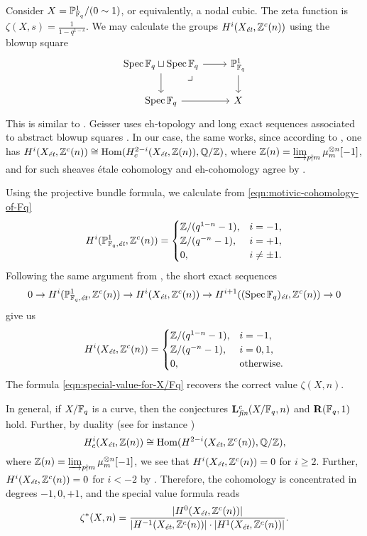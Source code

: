 \documentclass{article}
\numberwithin{equation}{section}
\begin{document}
\begin{example}
  Consider $X = \PP^1_{\FF_q}/(0\sim 1)$, or equivalently, a nodal cubic.
  The zeta function is $\zeta (X,s) = \frac{1}{1 - q^{1-s}}$.  We may calculate
  the groups $H^i (X_\et, \ZZ^c (n))$ using the blowup square
  \[ \begin{tikzcd}
      \Spec \FF_q \sqcup \Spec \FF_q \ar{r}\ar{d}\tikzpb & \PP^1_{\FF_q} \ar{d} \\
      \Spec \FF_q \ar{r} & X
    \end{tikzcd} \]
  This is similar to \cite[\S 8, Example~2]{Geisser-2006}. Geisser uses
  eh-topology and long exact sequences associated to abstract blowup squares
  \cite[Proposition~3.2]{Geisser-2006}. In our case, the same works, since
  according to \cite[Theorem~I]{Beshenov-Weil-etale-1}, one has
  $H^i (X_\et, \ZZ^c (n)) \cong \Hom (H^{2-i}_c (X_\et, \ZZ (n)),\QQ/\ZZ)$,
  where $\ZZ (n) = \varinjlim_{p\nmid m} \mu_m^{\otimes n} [-1]$, and
  for such sheaves étale cohomology and eh-cohomology agree by
  \cite[Theorem~3.6]{Geisser-2006}.

  Using the projective bundle formula, we calculate from
  \eqref{eqn:motivic-cohomology-of-Fq}
  \[ H^i (\PP^1_{\FF_q,\et}, \ZZ^c (n)) = \begin{cases}
      \ZZ/(q^{1-n} - 1), & i = -1, \\
      \ZZ/(q^{-n} - 1), & i = +1, \\
      0, & i \ne \pm 1.
    \end{cases} \]
  Following the same argument from \cite[\S 8, Example~2]{Geisser-2006},
  the short exact sequences
  \[ 0 \to H^i (\PP^1_{\FF_q,\et}, \ZZ^c (n)) \to
    H^i (X_\et, \ZZ^c (n)) \to
    H^{i+1} ((\Spec \FF_q)_\et, \ZZ^c (n)) \to 0 \]
  give us
  \[ H^i (X_\et, \ZZ^c (n)) = \begin{cases}
      \ZZ/(q^{1-n} - 1), & i = -1, \\
      \ZZ/(q^{-n} - 1), & i = 0,1, \\
      0, & \text{otherwise}.
    \end{cases} \]
  The formula \eqref{eqn:special-value-for-X/Fq} recovers the correct value
  $\zeta (X,n)$.
\end{example}

\begin{example}
  In general, if $X/\FF_q$ is a curve, then the conjectures
  $\mathbf{L}_\fin^c (X/\FF_q,n)$ and $\mathbf{R} (\FF_q,1)$ hold.
  Further, by duality
  (see for instance \cite[Theorem~1]{Beshenov-Weil-etale-1})
  $$H^i_c (X_\et, \ZZ(n)) \cong \Hom (H^{2-i} (X_\et, \ZZ^c (n)), \QQ/\ZZ),$$
  where
  $\ZZ (n) = \varinjlim_{p\nmid m} \mu_m^{\otimes n} [-1]$,
  we see that $H^i (X_\et, \ZZ^c (n)) = 0$ for $i \ge 2$. Further,
  $H^i (X_\et, \ZZ^c(n)) = 0$ for $i < -2$ by
  \cite[Lemma~4.1]{Beshenov-Weil-etale-1}. Therefore, the cohomology is
  concentrated in degrees $-1, 0, +1$, and the special value formula reads
  \[ \zeta^* (X,n) =
    \frac{|H^0 (X_\et, \ZZ^c (n))|}{|H^{-1} (X_\et, \ZZ^c (n))|\cdot |H^1 (X_\et, \ZZ^c (n))|}. \]
\end{example}
\end{document}
